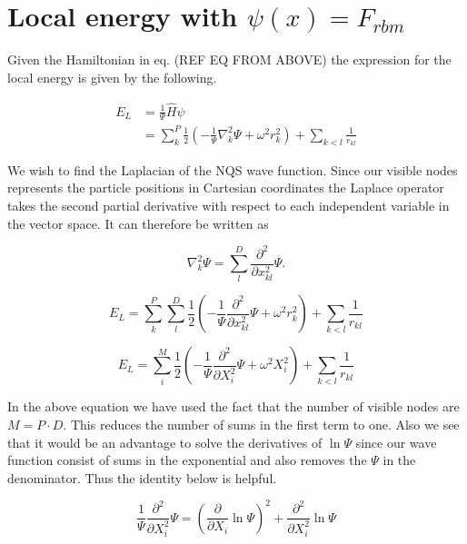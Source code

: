 \section{Local energy with $\psi(x) = F_{rbm}$}

Given the Hamiltonian in eq. (REF EQ FROM ABOVE) the expression for the local energy is given by the following.

\begin{align*}
E_L &= \frac{1}{\Psi}\hat{H}\psi \\
&= \sum_{k}^{P} \frac{1}{2} \left( -\frac{1}{\Psi} \nabla_k^2 \Psi +  \omega^2 r_k^2 \right) + \sum_{k < l} \frac{1}{r_{kl}}
\end{align*}

We wish to find the Laplacian of the NQS wave function. Since our visible nodes represents the particle positions in Cartesian coordinates the Laplace operator takes the second partial derivative with respect to each independent variable in the vector space. It can therefore be written as  

\begin{equation*}
\nabla_k^2 \Psi = \sum_{l}^{D} \frac{\partial^2}{\partial x_{kl}^2} \Psi.
\end{equation*}

\begin{equation*}
E_L = \sum_{k}^{P} \sum_{l}^{D} \frac{1}{2} \left( -\frac{1}{\Psi} \frac{\partial^2}{\partial x_{kl}^2} \Psi +  \omega^2 r_k^2 \right) + \sum_{k < l} \frac{1}{r_{kl}}
\end{equation*}

\begin{equation*}
E_L = \sum_{i}^{M} \frac{1}{2} \left( -\frac{1}{\Psi} \frac{\partial^2}{\partial X_{i}^2} \Psi +  \omega^2 X_i^2 \right) +  \sum_{k < l} \frac{1}{r_{kl}}
\end{equation*}

In the above equation we have used the fact that the number of visible nodes are $M = P \cdot D$. This reduces the number of sums in the first term to one. Also we see that it would be an advantage to solve the derivatives of $\ln \Psi$ since our wave function consist of sums in the exponential and also removes the $\Psi$ in the denominator. Thus the identity below is helpful. 

\begin{equation*}
\frac{1}{\Psi} \frac{\partial^2}{\partial X_{i}^2} \Psi = \left( \frac{\partial}{\partial X_{i}} \ln \Psi \right)^2 + \frac{\partial^2}{\partial X_{i}^2} \ln \Psi
\end{equation*}


